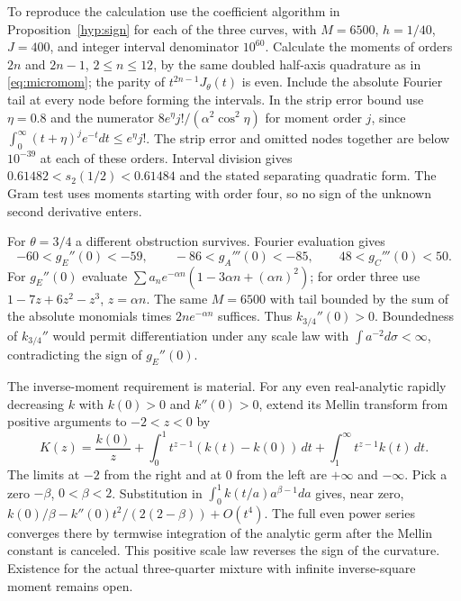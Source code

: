 \documentclass[11pt]{article}
\begin{document}
To reproduce the calculation use the coefficient algorithm in
Proposition~\ref{hyp:sign} for each of the three curves, with $M=6500$,
$h=1/40$, $J=400$, and integer interval denominator $10^{60}$.
Calculate the moments of orders $2n$ and $2n-1$, $2\le n\le12$,
by the same doubled half-axis quadrature as in \eqref{eq:micromom};
the parity of $t^{2n-1}J_\theta(t)$ is even. Include the absolute
Fourier tail at every node before forming the intervals. In the strip
error bound use $\eta=0.8$ and the numerator
$8e^\eta j!/(\alpha^2\cos^2\eta)$ for moment order $j$, since
$\int_0^\infty(t+\eta)^j e^{-t}dt\le e^\eta j!$.
The strip error and omitted nodes together are below $10^{-39}$ at each
of these orders. Interval division gives
$0.61482<s_2(1/2)<0.61484$ and the stated separating quadratic form.
The Gram test uses moments starting with order four, so no sign of
the unknown second derivative enters.

For $\theta=3/4$ a different obstruction survives. Fourier evaluation gives
\[
 -60<g_E''(0)<-59,\qquad
 -86<g_A'''(0)<-85,\qquad48<g_C'''(0)<50.
\]
For $g_E''(0)$ evaluate
$\sum a_ne^{-\alpha n}(1-3\alpha n+(\alpha n)^2)$;
for order three use $1-7z+6z^2-z^3$, $z=\alpha n$.
The same $M=6500$ with tail bounded by the sum of the absolute monomials
times $2n e^{-\alpha n}$ suffices. Thus $k_{3/4}''(0)>0$. Boundedness of
$k_{3/4}''$ would permit differentiation under any scale law with
$\int a^{-2}d\sigma<\infty$, contradicting the sign of $g_E''(0)$.

The inverse-moment requirement is material. For any even real-analytic
rapidly decreasing $k$ with $k(0)>0$ and $k''(0)>0$, extend its Mellin
transform from positive arguments to $-2<z<0$ by
\[
 K(z)=\frac{k(0)}{z}+\int_0^1t^{z-1}(k(t)-k(0))\,dt
                       +\int_1^\infty t^{z-1}k(t)\,dt .
\]
The limits at $-2$ from the right and at 0 from the left are $+\infty$
and $-\infty$. Pick a zero $-\beta$, $0<\beta<2$. Substitution in
$\int_0^1 k(t/a)a^{\beta-1}da$ gives, near zero,
$k(0)/\beta-k''(0)t^2/(2(2-\beta))+O(t^4)$.
The full even power series converges there by termwise integration of
the analytic germ after the Mellin constant is canceled. This positive
scale law reverses the sign of the curvature. Existence for the actual
three-quarter mixture with infinite inverse-square moment remains open.
\end{document}

